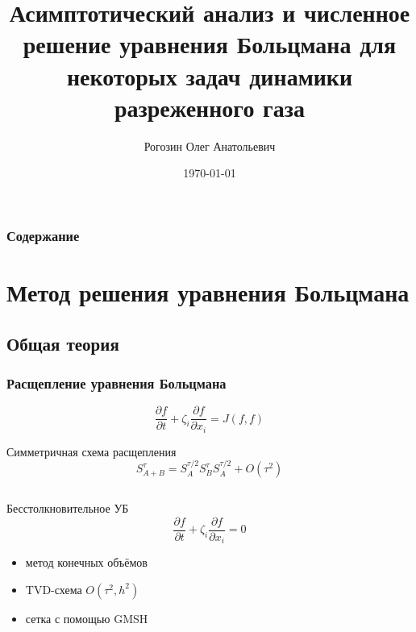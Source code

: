 \documentclass[mathserif]{beamer} %
\title{Асимптотический анализ и численное решение уравнения Больцмана для некоторых задач динамики разреженного газа}
\author{Рогозин Олег Анатольевич}
\institute{
    Московский физико-технический институт (государственный университет)
}
\date{\today}
\newcommand{\pder}[2][]{\frac{\partial#1}{\partial#2}}
\newcommand{\OO}[1]{O(#1)}
\begin{document}
\frame{\titlepage}

\begin{frame}
  \frametitle{Содержание}
  \linespread{0.8}
  \tableofcontents
\end{frame}

\section{Метод решения уравнения Больцмана}

\subsection{Общая теория}

\begin{frame}
    \frametitle{Расщепление уравнения Больцмана}
    \vspace{-5pt}
    \begin{equation}
        \pder[f]{t} + \zeta_i\pder[f]{x_i} = J(f,f)
    \end{equation}
    \pause\vspace{-10pt}
    \begin{block}{Симметричная схема расщепления}
        \begin{equation}
            S_{A+B}^{\tau} = S_A^{\tau/2}S_B^{\tau}S_A^{\tau/2} + \OO{\tau^2}
        \end{equation}
    \end{block}
    \vspace{-10pt}
    \begin{columns}[T]
        \pause
        \begin{column}{5cm}
            \begin{block}{Бесстолкновительное УБ}
                \begin{equation}
                    \pder[f]{t} + \zeta_i\pder[f]{x_i} = 0
                \end{equation}
                \vspace{-15pt}
                \begin{itemize}
                    \item метод конечных объёмов
                    \item TVD-схема \(\OO{\tau^2, h^2}\)
                    \item сетка с помощью GMSH
                \end{itemize}
            \end{block}
        \end{column}

\end{columns}
\end{frame}
\end{document}

